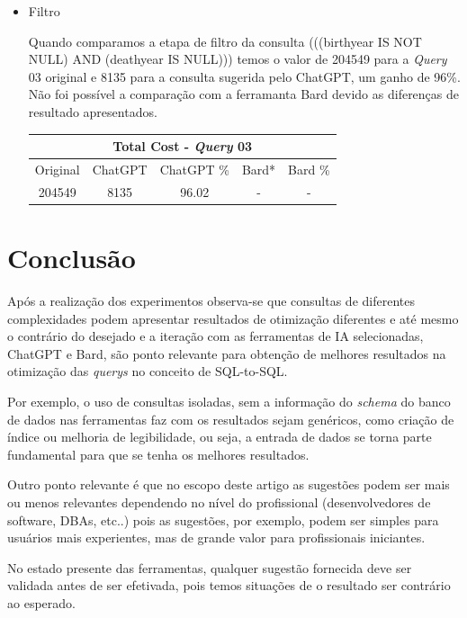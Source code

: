 \documentclass[12pt]{article}
\begin{document}
\begin{itemize}
\item{Filtro}

Quando comparamos a etapa de filtro da consulta (((birthyear IS NOT NULL) AND (deathyear IS NULL))) temos o valor de 204549 para a \emph{Query} 03 original e 8135 para a consulta sugerida pelo ChatGPT, um ganho de 96\%. Não foi possível a comparação com a ferramanta Bard devido as diferenças de resultado apresentados.\\

\begin{center}
\begin{tabular}{ |c|c|c|c|c| } 
 \hline
 \multicolumn{5}{|c|}{Total Cost - \emph{Query} 03} \\
 \hline
 Original & ChatGPT & ChatGPT \% & Bard* & Bard \% \\ [0.5ex] 
 \hline
  204549 & 8135 & 96.02 & - & - \\ 
  \hline
\end{tabular}
\end{center}

\end{itemize}

\section{Conclusão}

Após a realização dos experimentos observa-se que consultas de diferentes complexidades podem apresentar resultados de otimização diferentes e até mesmo o contrário do desejado e a iteração com as  ferramentas de IA selecionadas, ChatGPT e Bard, são ponto relevante para obtenção de melhores resultados na otimização das \emph{querys} no conceito de SQL-to-SQL.

Por exemplo, o uso de consultas isoladas, sem a informação do \emph{schema} do banco de dados nas ferramentas faz com os resultados sejam genéricos, como criação de índice ou melhoria de legibilidade, ou seja, a entrada de dados se torna parte fundamental para que se tenha os melhores resultados.

Outro ponto relevante é que no escopo deste artigo as sugestões podem ser mais ou menos relevantes dependendo no nível do profissional (desenvolvedores de software, DBAs, etc..) pois as sugestões, por exemplo, podem ser simples para usuários mais experientes, mas de grande valor para profissionais iniciantes.

No estado presente das ferramentas, qualquer sugestão fornecida deve ser validada antes de ser efetivada, pois temos situações de o resultado ser contrário ao esperado.
\end{document}
